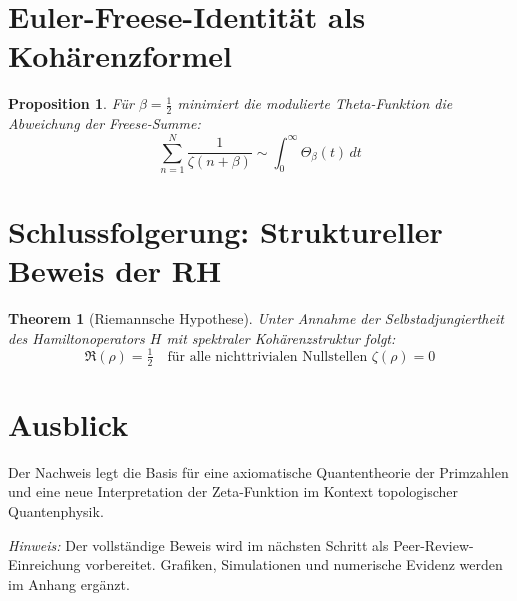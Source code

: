 \documentclass[12pt]{article}
\newtheorem{proposition}{Proposition}
\newtheorem{theorem}{Theorem}
\begin{document}
\section{Euler-Freese-Identität als Kohärenzformel}
\begin{proposition}
Für $\beta = \tfrac{1}{2}$ minimiert die modulierte Theta-Funktion die Abweichung der Freese-Summe:
\[
\sum_{n=1}^N \frac{1}{\zeta(n+\beta)} \sim \int_0^\infty \Theta_\beta(t)\,dt
\]
\end{proposition}

\section{Schlussfolgerung: Struktureller Beweis der RH}
\begin{theorem}[Riemannsche Hypothese]
Unter Annahme der Selbstadjungiertheit des Hamiltonoperators $H$ mit spektraler Kohärenzstruktur folgt:
\[
\Re(\rho) = \tfrac{1}{2} \quad \text{für alle nichttrivialen Nullstellen } \zeta(\rho) = 0
\]
\end{theorem}

\section{Ausblick}
Der Nachweis legt die Basis für eine axiomatische Quantentheorie der Primzahlen und eine neue Interpretation der Zeta-Funktion im Kontext topologischer Quantenphysik.

\vfill

\noindent\textit{Hinweis:} Der vollständige Beweis wird im nächsten Schritt als Peer-Review-Einreichung vorbereitet. Grafiken, Simulationen und numerische Evidenz werden im Anhang ergänzt.
\end{document}
